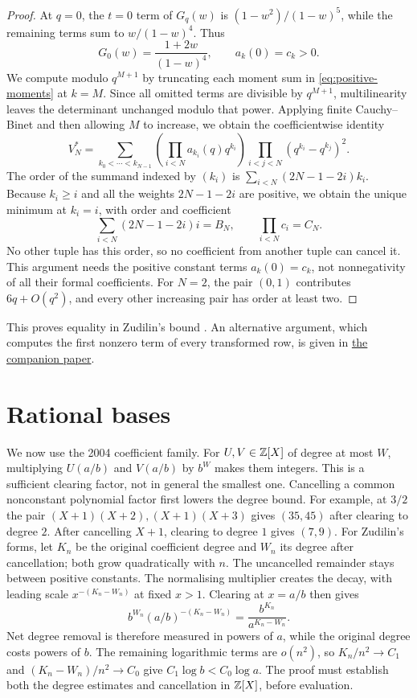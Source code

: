\documentclass[11pt]{article}
\newcommand{\shortrecordlink}[3]{\href{#1\##2}{#3}}
\begin{document}
\begin{proof}
At $q=0$, the $t=0$ term of $G_q(w)$ is $(1-w^2)/(1-w)^5$, while the
remaining terms sum to $w/(1-w)^4$. Thus
\[
 G_0(w)=\frac{1+2w}{(1-w)^4},\qquad a_k(0)=c_k>0.
\]
We compute modulo $q^{M+1}$ by truncating each moment sum in
\eqref{eq:positive-moments} at $k=M$. Since all omitted terms are
divisible by $q^{M+1}$, multilinearity leaves the determinant
unchanged modulo that power. Applying finite Cauchy--Binet and then
allowing $M$ to increase, we obtain the coefficientwise identity
\[
 V_N^*=\sum_{k_0<\cdots<k_{N-1}}
 \left(\prod_{i<N}a_{k_i}(q)q^{k_i}\right)
 \prod_{i<j<N}(q^{k_i}-q^{k_j})^2.
\]
The order of the summand indexed by $(k_i)$ is
$\sum_{i<N}(2N-1-2i)k_i$. Because $k_i\ge i$ and all the weights
$2N-1-2i$ are positive, we obtain the unique minimum at $k_i=i$,
with order and coefficient
\[
 \sum_{i<N}(2N-1-2i)i=B_N,\qquad \prod_{i<N}c_i=C_N.
\]
No other tuple has this order, so no coefficient from another tuple
can cancel it. This argument needs the positive constant terms
$a_k(0)=c_k$, not nonnegativity of all their formal coefficients.
For $N=2$, the pair $(0,1)$ contributes $6q+O(q^2)$,
and every other increasing pair has order at least two.
\end{proof}

This proves equality in Zudilin's bound
\cite[\S4, pp.~6--7]{zudilin2016}. An alternative argument, which
computes the first nonzero term of every transformed row, is given in
\shortrecordlink{erdos1049-rational-base-lambert-reasoning-surface.pdf}
{long1049-formal-rows}{the companion paper}.

\section{Rational bases}
\label{sec:rational-base-irrationality}

We now use the 2004 coefficient family. For $U,V\in\mathbb{Z}[X]$ of degree
at most $W$, multiplying $U(a/b)$ and $V(a/b)$ by $b^W$ makes them
integers. This is a sufficient clearing factor, not in general the
smallest one. Cancelling a common nonconstant polynomial factor first lowers the
degree bound. For example, at $3/2$ the pair
$(X+1)(X+2),(X+1)(X+3)$ gives $(35,45)$ after clearing to degree $2$.
After cancelling $X+1$, clearing to degree $1$ gives $(7,9)$.
For Zudilin's forms, let $K_n$ be the original coefficient degree
and $W_n$ its degree after cancellation; both grow quadratically
with $n$. The uncancelled remainder stays between positive constants. The normalising multiplier creates the decay, with
leading scale $x^{-(K_n-W_n)}$ at fixed $x>1$. Clearing at $x=a/b$
then gives
\begin{equation}\label{eq:degree-balance}
 b^{W_n}(a/b)^{-(K_n-W_n)}
 =\frac{b^{K_n}}{a^{K_n-W_n}}.
\end{equation}
Net degree removal is therefore measured in powers of $a$, while
the original degree costs powers of $b$. The remaining logarithmic
terms are $o(n^2)$, so $K_n/n^2\to C_1$ and
$(K_n-W_n)/n^2\to C_0$ give $C_1\log b<C_0\log a$.
The proof must establish both the degree estimates and cancellation
in $\mathbb{Z}[X]$, before evaluation.
\end{document}
